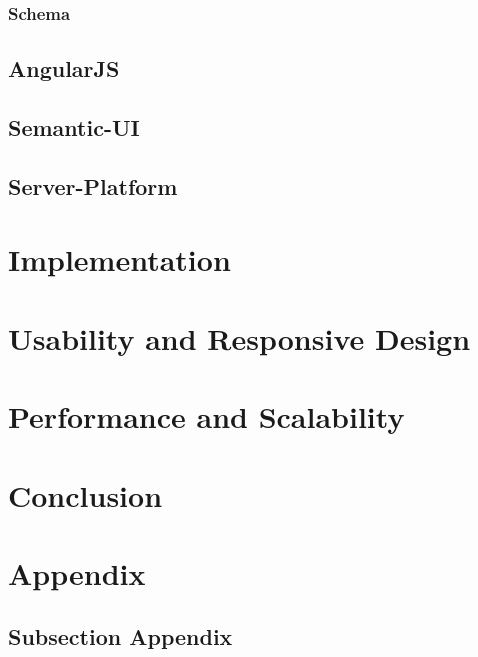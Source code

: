 \subsection{Schema}
\section{AngularJS}
\section{Semantic-UI}
\section{Server-Platform}

\chapter{Implementation}

\chapter{Usability and Responsive Design}

\chapter{Performance and Scalability}

\chapter{Conclusion}

\cleardoublepage
\appendixheader

\setcounter{section}{0}
\setcounter{chapter}{0}
\renewcommand{\thesection}{A.\arabic{section}}
\renewcommand{\thechapter}{A}



\chapter*{Appendix}  %
\setcounter{section}{0}
\setcounter{chapter}{0}
\renewcommand{\thesection}{A.\arabic{section}}
\renewcommand{\thechapter}{A}  


\section{Subsection Appendix}

\cleardoublepage
\nocite{*}



